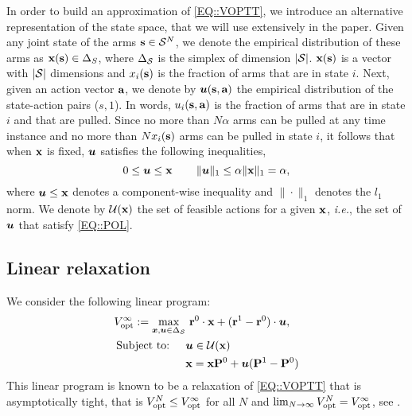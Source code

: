 In order to build an approximation of \eqref{EQ::VOPTT}, we introduce an alternative representation of the state space, that we will use extensively in the paper. Given any joint state of the arms $\textbf{s}\in\mathcal{S}^{N}$, we denote the empirical distribution of these arms as $\textbf{x}(\textbf{s})\in\Delta_S$, where $\Delta_{\mathcal{S}}$ is the simplex of dimension $|\mathcal{S}|$. $\textbf{x}(\textbf{s})$ is a vector with $|\mathcal{S}|$ dimensions and $x_i(\textbf{s})$ is the fraction of arms that are in state $i$.  Next, given an action vector $\textbf{a}$, we denote by $\bm{u}(\textbf{s}, \textbf{a})$ the empirical distribution of the state-action pairs ($s,1$). In words, $u_i(\textbf{s},\textbf{a})$ is the fraction of arms that are in state $i$ and that are pulled.  Since no more than $N\alpha$ arms can be pulled at any time instance and no more than $Nx_i(\textbf{s})$ arms can be pulled in state $i$, it follows that when $\textbf{x}$ is fixed, $\bm{u}$ satisfies the following inequalities,
    \begin{equation}\label{EQ::POL}
    0 \leq \bm{u} \leq \textbf{x} \hspace{0.3 in} \|\bm{u}\|_1 \leq \alpha \|\textbf{x}\|_1 = \alpha,
\end{equation}
where $\bm{u}\leq\textbf{x}$ denotes a component-wise inequality and $\|\cdot \|_1$ denotes the $l_1$ norm. We denote by $\mathcal{U}(\textbf{x})$ the set of feasible actions for a given $\textbf{x}$, \emph{i.e.}, the set of $\bm{u}$ that satisfy \eqref{EQ::POL}.

\subsection{Linear relaxation}

We consider the following linear program:
\begin{subequations}
    \label{EQ::VOPTDYN-Tinf}
    \begin{align}
       V_{\text{opt}}^{\infty} := \max_{{\bm{x}},\bm{u}\in\Delta_{\mathcal{S}}}&~ \mathbf{r}^{0}\cdot \textbf{x} + (\mathbf{r}^{1} - \mathbf{r}^{0})\cdot\bm{u},\label{EQ:VOPTDYN-inf1}\\
        \text{Subject to: }\quad
        &\bm{u} \in \mathcal{U}(\textbf{x}) \label{EQ::MF3-inf}\\
        &\textbf{x} = \textbf{x}  \mathbf{P}^{0} +  \bm{u} (\mathbf{P}^{1} - \mathbf{P}^{0}) \label{EQ::MF2-inf}
    \end{align}
\end{subequations}
This linear program is known to be a relaxation of \eqref{EQ::VOPTT} that is asymptotically tight, that is $V_{\text{opt}}^{N}\le V_{\text{opt}}^{\infty}$ for all $N$ and $\lim_{N\to\infty}V_{\text{opt}}^{N}=V_{\text{opt}}^{\infty}$, see \citet{GGY23b,HXCW24}.%

